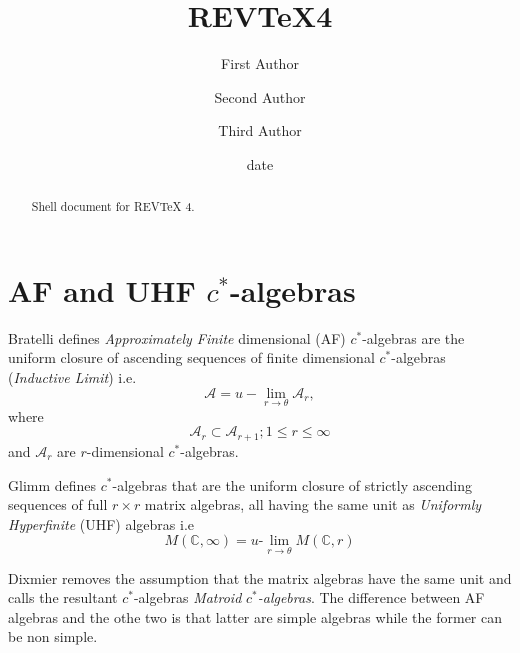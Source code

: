 \documentclass[aps,preprint]{revtex4}%
\begin{document}
\title[Short title for running header]{REV\TeX4}
\author{First Author}
\author{Second Author}
\author{Third Author}

\begin{abstract}
Shell document for REV\TeX{} 4.

\end{abstract}
\date[Date text]{date}




\maketitle
\tableofcontents


\section{AF and UHF $c^{\ast}$-algebras}

Bratelli defines \emph{Approximately Finite} dimensional (AF) $c^{\ast}%
$-algebras are the uniform closure of ascending sequences of finite
dimensional $c^{\ast}$-algebras (\emph{Inductive Limit}) i.e.
\begin{equation}
\mathcal{A}=u-\lim\limits_{r\rightarrow\theta}\mathcal{A}_{r},
\end{equation}
where
\begin{equation}
\mathcal{A}_{r}\subset\mathcal{A}_{r+1};1\leq r\leq\infty
\end{equation}
and $\mathcal{A}_{r}$ are $r$-dimensional $c^{\ast}$-algebras. 

Glimm defines $c^{\ast}$-algebras that are the uniform closure of strictly
ascending sequences of full $r\times r$ matrix algebras, all having the same
unit as \emph{Uniformly Hyperfinite} (UHF) algebras i.e
\begin{equation}
M\left(  \mathbb{C},\infty\right)  =u\text{-}\lim\limits_{r\rightarrow\theta
}M\left(  \mathbb{C},r\right)
\end{equation}


Dixmier removes the assumption that the matrix algebras have the same unit and
calls the resultant $c^{\ast}$-algebras \emph{Matroid }$c^{\ast}%
$\emph{-algebras}. The difference between AF algebras and the othe two is that
latter are simple algebras while the former can be non simple.  
\end{document}
